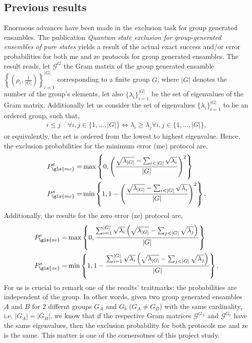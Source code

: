 \documentclass[12pt,letterpaper]{article}
\begin{document}
\begin{multicols}{2}
\subsection{Previous results}
Enormous advances have been made in the exclusion task for group generated ensambles. The publication \emph{Quantum state exclusion for group-generated ensembles of pure states}\cite{MainPaper} yields a result of the actual exact success and/or error probabilities for both \gls{me} and \gls{ze} protocols for group generated ensambles. The result reads, let $\mathcal{G}^{G}$ the Gram matrix of the group generated ensamble $\left\{\left(\rho_i,\frac{1}{|G|}\right)\right\}_{i=1}^{|G|}$ corresponding to a finite group $G$, where $|G|$ denotes the number of the group's elements, let also $\{\lambda_i\}_{i=1}^{|G|}$ be the set of eigenvalues of the Gram matrix. Additionally let us consider the set of eigenvalues $\{\lambda_i\}_{i=1}^{|G|}$ to be an ordered group, such that,
\begin{align*}
	i\leq j\quad\forall i,j\in\{1,...,|G|\}\Leftrightarrow \lambda_i\geq\lambda_j \forall i,j\in\{1,...,|G|\},
\end{align*}
or equivalently, the set is ordered from the lowest to highest eigenvalue. Hence, the exclusion probabilities for the minimum error (\gls{me}) protocol are,
\begin{align*}
	P_{\gls{me}}^e=&\max\left\{0,\left(\frac{\sqrt{\lambda_{|G|}}-\sum_{i<|G|}\sqrt{\lambda_i}}{|G|}\right)^2\right\}\\
	P_{\gls{me}}^s=&\min\left\{1,1-\left(\frac{\sqrt{\lambda_{|G|}}-\sum_{i<|G|}\sqrt{\lambda_i}}{|G|}\right)^2\right\}.
\end{align*}
Additionally, the results for the zero error (\gls{ze}) protocol are,
\begin{align*}
	P_{\gls{ze}}^e=&\max\left\{0,\frac{\sum_{i=1}^{|G|}\sqrt{\lambda_i}\left(\sqrt{\lambda_{|G|}}-\sum_{j<|G|}\sqrt{\lambda_j}\right)}{|G|}\right\}\\
	P_{\gls{ze}}^s=&\min\left\{1,1-\frac{\sum_{i=1}^{|G|}\sqrt{\lambda_i}\left(\sqrt{\lambda_{|G|}}-\sum_{j<|G|}\sqrt{\lambda_j}\right)}{|G|}\right\}.
\end{align*}
For us is crucial to remark one of the results' traitmarks: the probabilities are independent of the group. In other words, given two group generated ensambles $A$ and $B$ for 2 differnt groups $G_A$ and $G_b$ ($G_A\neq G_B$) with the same cardinality, i.e. $|G_A|=|G_B|$, we know that if the respective Gram matrices $\mathcal{G}^{G_A}$ and $\mathcal{G}^{G_b}$ have the same eigenvalues, then the exclusion probability for both protocols \gls{me} and \gls{ze} is the same. This matter is one of the cornersotnes of this project study.


\end{multicols}
\end{document}
